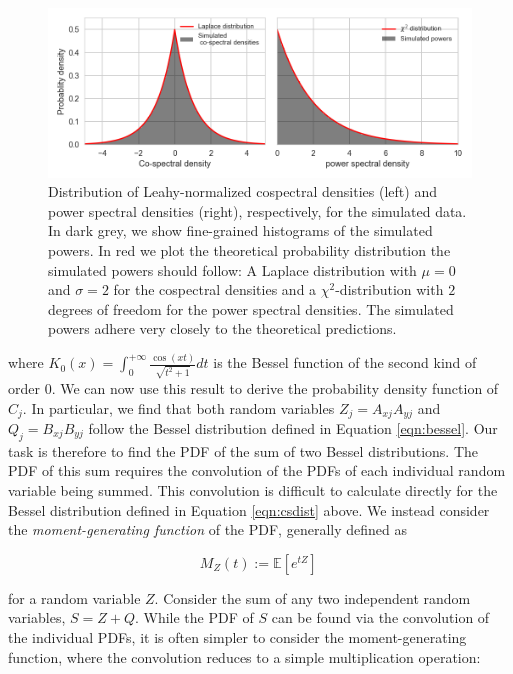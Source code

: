 \documentclass[12pt]{emulateapj}
\begin{document}
\begin{figure}
\begin{center}
\includegraphics[width=\textwidth]{../figs/cs_dist.png}
\caption{Distribution of Leahy-normalized cospectral densities (left) and power spectral densities (right), respectively, for the simulated data. In dark grey, we show fine-grained histograms of the simulated powers. In red we plot the theoretical probability distribution the simulated powers should follow: A Laplace distribution with $\mu=0$ and $\sigma=2$ for the cospectral densities and a $\chi^2$-distribution with $2$ degrees of freedom for the power spectral densities. The simulated powers adhere very closely to the theoretical predictions.}
\label{fig:csdist}
\end{center}
\end{figure}

\noindent where $K_0(x) = \int_{0}^{+\infty}{\frac{\cos{(xt)}}{\sqrt{t^2 + 1}} dt}$ is the Bessel function of the second kind of order $0$. We can now use this result to derive the probability density function of $C_j$. In particular, we find that both random variables $Z_j = A_{xj} A_{yj}$ and $Q_j = B_{xj} B_{yj}$ follow the Bessel distribution defined in Equation \ref{eqn:bessel}. Our task is therefore to find the PDF of the sum of two Bessel distributions. The PDF of this sum requires the convolution of the PDFs of each individual random variable being summed. This convolution is difficult to calculate directly for the Bessel distribution defined in Equation \ref{eqn:csdist} above. We instead consider the \textit{moment-generating function} of the PDF, generally defined as 

\begin{equation}
M_Z(t) := \mathbb{E}[e^{tZ}] \, 
\end{equation}

\noindent for a random variable $Z$. Consider the sum of any two independent random variables, $S = Z + Q$. While the PDF of $S$ can be found via the convolution of the individual PDFs, it is often simpler to consider the moment-generating function, where the convolution reduces to a simple multiplication operation:
\end{document}
